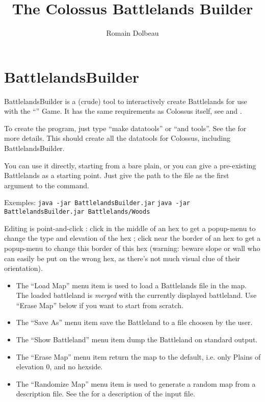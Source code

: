 \documentclass{article}
\begin{document}

\title{The Colossus Battlelands Builder}

\author{Romain Dolbeau}

\maketitle

\section{BattlelandsBuilder}

BattlelandsBuilder is a (crude) tool to interactively
create Battlelands for use with the
``'' Game.
It has the same requirements as Colossus itself, see
and
.

To create the program, just type ``make datatools'' or ``and tools''.
See the
for more details.
This should create all the datatools for Colossus, including
BattlelandsBuilder.

You can use it directly, starting from a bare plain,
or you can give a pre-existing Battlelands as a
starting point. Just give the path to the file as
the first argument to the command.

Exemples:
\texttt{java -jar BattlelandsBuilder.jar}
\texttt{java -jar BattlelandsBuilder.jar Battlelands/Woods}

Editing is point-and-click : click in the middle
of an hex to get a popup-menu to change the type
and elevation of the hex ; click near the border of
an hex to get a popup-menu to change this border of
this hex (warning: beware slope or wall who can
easily be put on the wrong hex, as there's not much
visual clue of their orientation).

\begin{itemize}

\item The ``Load Map'' menu item is used to load a Battlelands 
file in the map. The loaded battleland is \emph{merged}
with the currently displayed battleland. Use ``Erase Map''
below if you want to start from scratch.

\item The ``Save As'' menu item save the Battleland to a
file choosen by the user.

\item The ``Show Battleland'' menu item dump the Battleland
on standard output.

\item The ``Erase Map'' menu item return the map to the
default, i.e. only Plains of elevation 0, and no
hexside.

\item The ``Randomize Map'' menu item is used to generate
a random map from a description file. See the
for a description of the input file.

\end{itemize}
\end{document}
